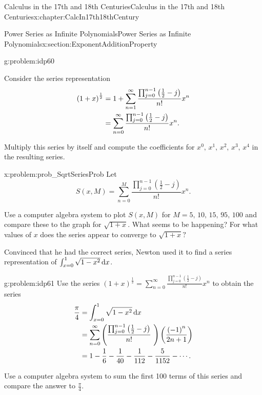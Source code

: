 \begin{chapterptx}{Calculus in the 17th and 18th Centuries}{}{Calculus in the 17th and 18th Centuries}{}{}{x:chapter:CalcIn17th18thCentury}
\begin{sectionptx}{Power Series as Infinite Polynomials}{}{Power Series as Infinite Polynomials}{}{}{x:section:ExponentAdditionProperty}
		\begin{problem}{}{g:problem:idp60}%
			\par
			Consider the series representation%
			\begin{align*}
				\left(1+x\right)^{\frac{1}{2}}& =1+\sum_{n=1}^\infty\frac{\prod_{j=0}^{n-1}\left(\frac{1}{2}-j\right)}{n!}x^n\\
				&  =\sum_{n=0}^\infty\frac{\prod_{j=0}^{n-1}\left(\frac{1}{2}-j\right)}{n!}x^n\text{.}
			\end{align*}
			\par
			Multiply this series by itself and compute the coefficients for \(x^0,\,x^1,\,x^2,\,x^3,\,x^4\) in the resulting series.%
		\end{problem}
		\begin{problem}{}{x:problem:prob_SqrtSeriesProb}%
			 Let%
			\begin{equation*}
				S(x,M)=\sum_{n=0}^M\frac{\prod_{j=0}^{n-1}\left(\frac{1}{2}-j \right)}{n!}x^n\text{.}
			\end{equation*}
			\par
			Use a computer algebra system to plot \(S(x,M)\) for \(M=5,\,10,\,15,\,95,\,100\) and compare these to the graph for \(\sqrt{1+x}\). What seems to be happening? For what values of \(x\) does the series appear to converge to \(\sqrt{1+x}?\)%
		\end{problem}
		Convinced that he had the correct series, Newton used it to find a series representation of \(\int_{x=0}^1\sqrt{1-x^2} \,{\rm d} x\).%
		\begin{problem}{}{g:problem:idp61}%
			 Use the series \(\displaystyle \left(1+x\right)^{\frac{1}{2}}=\sum_{n=0}^\infty\frac{\prod_{j=0}^{n-1}\left(\frac{1}{2}-j\right)}{n!}x^n\) to obtain the series%
			\begin{align*}
				\frac{\pi}{4}& =\int_{x=0}^1\sqrt{1-x^2} \,{\rm d} x\\
				& =\sum_{n=0}^\infty\left(\frac{\prod_{j=0}^{n-1}\left(\frac{1}{2}-j\right)}{n!}\text{ } \right)\left(\frac{\left(-1\right)^n}{2n+1}\right)\\
				& =1-\frac{1}{6}-\frac{1}{40}-\frac{1}{112}-\frac{5}{1152}-\cdots\text{.}
			\end{align*}
			\par
			Use a computer algebra system to sum the first 100 terms of this series and compare the answer to \(\frac{\pi}{4}\).%
		\end{problem}

\end{sectionptx}
\end{chapterptx}
